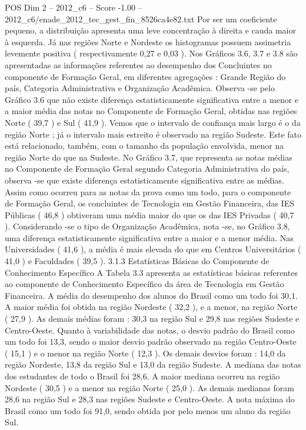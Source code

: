 \begin{textsample}{POS Dim 2 – 2012\_c6 – Score -1.00 – 2012\_c6/enade\_2012\_tec\_gest\_fin\_8526ca4e82.txt}
Por ser um coeficiente pequeno, a distribuição apresenta uma leve concentração à direita e cauda maior à esquerda.
Já nas regiões Norte e Nordeste os histogramas possuem assimetria levemente positiva ( respectivamente 0,27 e 0,03 ).
Nos Gráficos 3.6, 3.7 e 3.8 são apresentadas as informações referentes ao desempenho dos Concluintes no componente de Formação Geral, em diferentes agregações : Grande Região do país, Categoria Administrativa e Organização Acadêmica.
Observa -se pelo Gráfico 3.6 que não existe diferença estatisticamente significativa entre a menor e a maior média das notas no Componente de Formação Geral, obtidas nas regiões Norte ( 39,7 ) e Sul ( 41,9 ).
Vemos que o intervalo de confiança mais largo é o da região Norte ; já o intervalo mais estreito é observado na região Sudeste.
Este fato está relacionado, também, com o tamanho da população envolvida, menor na região Norte do que na Sudeste.
No Gráfico 3.7, que representa as notas médias no Componente de Formação Geral segundo Categoria Administrativa do país, observa -se que existe diferença estatisticamente significativa entre as médias.
Assim como ocorreu para as notas da prova como um todo, para o componente de Formação Geral, os concluintes de Tecnologia em Gestão Financeira, das IES Públicas ( 46,8 ) obtiveram uma média maior do que os das IES Privadas ( 40,7 ).
Considerando -se o tipo de Organização Acadêmica, nota -se, no Gráfico 3.8, uma diferença estatisticamente significativa entre a maior e a menor média.
Nas Universidades ( 41,6 ), a média é mais elevada do que em Centros Universitários ( 41,0 ) e Faculdades ( 39,5 ). 3.1.3 Estatísticas Básicas do Componente de Conhecimento Específico A Tabela 3.3 apresenta as estatísticas básicas referentes ao componente de Conhecimento Específico da área de Tecnologia em Gestão Financeira.
A média do desempenho dos alunos do Brasil como um todo foi 30,1.
A maior média foi obtida na região Nordeste ( 32,2 ), e a menor, na região Norte ( 27,9 ).
As demais médias foram : 30,3 na região Sul e 29,8 nas regiões Sudeste e Centro-Oeste.
Quanto à variabilidade das notas, o desvio padrão do Brasil como um todo foi 13,3, sendo o maior desvio padrão observado na região Centro-Oeste ( 15,1 ) e o menor na região Norte ( 12,3 ).
Os demais desvios foram : 14,0 da região Nordeste, 13,8 da região Sul e 13,0 da região Sudeste.
A mediana das notas dos estudantes de todo o Brasil foi 28,6.
A maior mediana ocorreu na região Nordeste ( 30,5 ) e a menor na região Norte ( 25,0 ).
As demais medianas foram 28,6 na região Sul e 28,3 nas regiões Sudeste e Centro-Oeste.
A nota máxima do Brasil como um todo foi 91,0, sendo obtida por pelo menos um aluno da região Sul.

\end{textsample}
